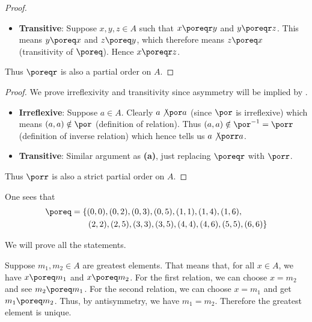 \begin{questions}
\begin{partquestions}{\alph*}
\begin{proof}
\begin{itemize}
                \item \textbf{Transitive}: Suppose $x,y,z \in A$ such that $x \poreqr y$ and $y \poreqr z$. This means $y \poreq x$ and $z \poreq y$, which therefore means $z \poreq x$ (transitivity of $\poreq$). Hence $x \poreqr z$.
            \end{itemize}
            Thus $\poreqr$ is also a partial order on $A$.
        \end{proof}

        \item \begin{proof}
            We prove irreflexivity and transitivity since asymmetry will be implied by .
            \begin{itemize}
                \item \textbf{Irreflexive}: Suppose $a \in A$. Clearly $a \not\por a$ (since $\por$ is irreflexive) which means $(a,a) \notin \por$ (definition of relation). Thus $(a,a) \notin \por^{-1} = \porr$ (definition of inverse relation) which hence tells us $a \not\porr a$.
                
                \item \textbf{Transitive}: Similar argument as \textbf{(a)}, just replacing $\poreqr$ with $\porr$.
            \end{itemize}
            Thus $\porr$ is also a strict partial order on $A$.
        \end{proof}
    \end{partquestions}

    \item One sees that
    \begin{align*}
        \poreq &= \{
            (0, 0), (0, 2), (0, 3), (0, 5),
            (1, 1), (1, 4), (1, 6),\\
            &\quad\quad(2, 2), (2, 5),
            (3, 3), (3, 5),
            (4, 4), (4, 6),
            (5, 5),
            (6, 6)
        \}
    \end{align*}

    \item We will prove all the statements.
    \begin{partquestions}{\alph*}
        \item Suppose $m_1, m_2 \in A$ are greatest elements. That means that, for all $x \in A$, we have $x \poreq m_1$ and $x \poreq m_2$. For the first relation, we can choose $x = m_2$ and see $m_2 \poreq m_1$. For the second relation, we can choose $x = m_1$ and get $m_1 \poreq m_2$. Thus, by antisymmetry, we have $m_1 = m_2$. Therefore the greatest element is unique.
        

\end{partquestions}
\end{questions}
